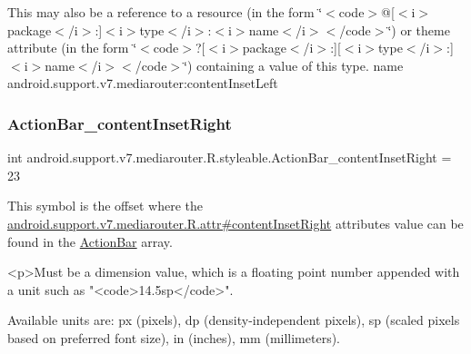 This may also be a reference to a resource (in the form \char`\"{}$<$code$>$@\mbox{[}$<$i$>$package$<$/i$>$\+:\mbox{]}$<$i$>$type$<$/i$>$\+:$<$i$>$name$<$/i$>$$<$/code$>$\char`\"{}) or theme attribute (in the form \char`\"{}$<$code$>$?\mbox{[}$<$i$>$package$<$/i$>$\+:\mbox{]}\mbox{[}$<$i$>$type$<$/i$>$\+:\mbox{]}$<$i$>$name$<$/i$>$$<$/code$>$\char`\"{}) containing a value of this type.  name android.\+support.\+v7.\+mediarouter\+:content\+Inset\+Left \mbox{\label{classandroid_1_1support_1_1v7_1_1mediarouter_1_1R_1_1styleable_a015913d4c4cc4f35f6b5377bf926d3c7}} 
\subsubsection{\texorpdfstring{Action\+Bar\+\_\+content\+Inset\+Right}{ActionBar\_contentInsetRight}}
{\footnotesize\ttfamily int android.\+support.\+v7.\+mediarouter.\+R.\+styleable.\+Action\+Bar\+\_\+content\+Inset\+Right = 23\hspace{0.3cm}{\ttfamily [static]}}

This symbol is the offset where the \hyperlink{classandroid_1_1support_1_1v7_1_1mediarouter_1_1R_1_1attr_ac57c06096a1114b7df0d88f8fe7d666b}{android.\+support.\+v7.\+mediarouter.\+R.\+attr\#content\+Inset\+Right} attribute\textquotesingle{}s value can be found in the \hyperlink{classandroid_1_1support_1_1v7_1_1mediarouter_1_1R_1_1styleable_adc4d3c0d096085367f12d025007aa53f}{Action\+Bar} array.

\begin{DoxyVerb}      <p>Must be a dimension value, which is a floating point number appended with a unit such as "<code>14.5sp</code>".
\end{DoxyVerb}
 Available units are\+: px (pixels), dp (density-\/independent pixels), sp (scaled pixels based on preferred font size), in (inches), mm (millimeters). 

